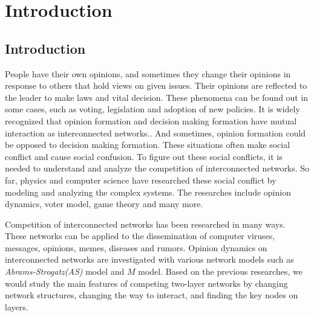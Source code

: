 
\chapter{Introduction}
\label{chap:intro}
\section{Introduction}
People have their own opinions, and sometimes they change their opinions in response to others that hold views on given issues. Their opinions are reflected to the leader to make laws and vital decision. These phenomena can be found out  in some cases, such as voting, legislation and adoption of new policies. It is widely recognized that opinion formation and decision making formation have mutual interaction as interconnected networks.\cite{mikko2013, danziger2019, newman2010, boccaletti2014, domenico2013, tomasini2015, namkhanhvu2017}. And sometimes, opinion formation could be opposed to decision making formation. These situations often make social conflict and cause social confusion. To figure out these social conflicts, it is needed to understand and analyze the competition of interconnected networks. So far, physics and computer science have researched these social conflict by modeling and analyzing the complex systems\cite{huberman2004, zuev2012, laguna2004, masuda2015}. The researches include opinion dynamics, voter model, game theory and many more\cite{bianconi2018}. 

Competition of interconnected networks has been researched in many ways. These networks can be applied to the dissemination of computer viruses, messages, opinions, memes, diseases and rumors\cite{hua2014,shenyu2018, zhou2018, alvarez2016,gomez2015,diep2017,rocca2014,velasquez2018}. Opinion dynamics on interconnected networks are investigated with various network models such as \textit{Abrams-Strogatz(AS)} model\cite{abrams2003,vazquez2010} and $M$ model\cite{rocca2014}.  Based on the previous researches, we would study the main features of competing two-layer networks by changing network structures, changing the way to interact, and finding the key nodes on layers. 

